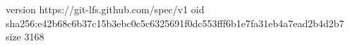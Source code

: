 version https://git-lfs.github.com/spec/v1
oid sha256:e42b68c6b37c15b3ebc0c5c6325691f0dc553fff6b1e7fa31eb4a7ead2b4d2b7
size 3168
